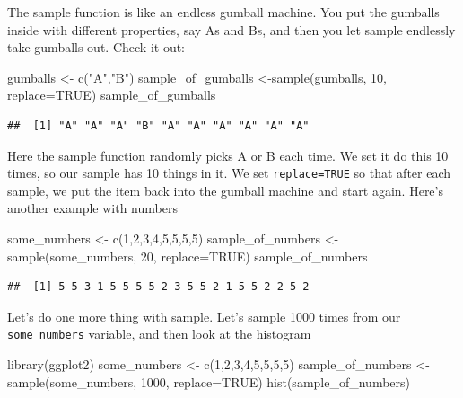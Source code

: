 \documentclass[
]{book}
\newenvironment{Shaded}{\begin{snugshade}}{\end{snugshade}}
\newcommand{\AttributeTok}[1]{\textcolor[rgb]{0.77,0.63,0.00}{#1}}
\newcommand{\ConstantTok}[1]{\textcolor[rgb]{0.00,0.00,0.00}{#1}}
\newcommand{\DecValTok}[1]{\textcolor[rgb]{0.00,0.00,0.81}{#1}}
\newcommand{\FunctionTok}[1]{\textcolor[rgb]{0.00,0.00,0.00}{#1}}
\newcommand{\NormalTok}[1]{#1}
\newcommand{\OtherTok}[1]{\textcolor[rgb]{0.56,0.35,0.01}{#1}}
\newcommand{\StringTok}[1]{\textcolor[rgb]{0.31,0.60,0.02}{#1}}
\begin{document}
The sample function is like an endless gumball machine. You put the gumballs inside with different properties, say As and Bs, and then you let sample endlessly take gumballs out. Check it out:

\begin{Shaded}
\begin{Highlighting}[]
\NormalTok{gumballs }\OtherTok{\textless{}{-}} \FunctionTok{c}\NormalTok{(}\StringTok{"A"}\NormalTok{,}\StringTok{"B"}\NormalTok{)}
\NormalTok{sample\_of\_gumballs }\OtherTok{\textless{}{-}}\FunctionTok{sample}\NormalTok{(gumballs, }\DecValTok{10}\NormalTok{, }\AttributeTok{replace=}\ConstantTok{TRUE}\NormalTok{)}
\NormalTok{sample\_of\_gumballs}
\end{Highlighting}
\end{Shaded}

\begin{verbatim}
##  [1] "A" "A" "A" "B" "A" "A" "A" "A" "A" "A"
\end{verbatim}

Here the sample function randomly picks A or B each time. We set it do this 10 times, so our sample has 10 things in it. We set \texttt{replace=TRUE} so that after each sample, we put the item back into the gumball machine and start again. Here's another example with numbers

\begin{Shaded}
\begin{Highlighting}[]
\NormalTok{some\_numbers }\OtherTok{\textless{}{-}} \FunctionTok{c}\NormalTok{(}\DecValTok{1}\NormalTok{,}\DecValTok{2}\NormalTok{,}\DecValTok{3}\NormalTok{,}\DecValTok{4}\NormalTok{,}\DecValTok{5}\NormalTok{,}\DecValTok{5}\NormalTok{,}\DecValTok{5}\NormalTok{,}\DecValTok{5}\NormalTok{)}
\NormalTok{sample\_of\_numbers }\OtherTok{\textless{}{-}}\FunctionTok{sample}\NormalTok{(some\_numbers, }\DecValTok{20}\NormalTok{, }\AttributeTok{replace=}\ConstantTok{TRUE}\NormalTok{)}
\NormalTok{sample\_of\_numbers}
\end{Highlighting}
\end{Shaded}

\begin{verbatim}
##  [1] 5 5 3 1 5 5 5 5 2 3 5 5 2 1 5 5 2 2 5 2
\end{verbatim}

Let's do one more thing with sample. Let's sample 1000 times from our \texttt{some\_numbers} variable, and then look at the histogram

\begin{Shaded}
\begin{Highlighting}[]
\FunctionTok{library}\NormalTok{(ggplot2)}
\NormalTok{some\_numbers }\OtherTok{\textless{}{-}} \FunctionTok{c}\NormalTok{(}\DecValTok{1}\NormalTok{,}\DecValTok{2}\NormalTok{,}\DecValTok{3}\NormalTok{,}\DecValTok{4}\NormalTok{,}\DecValTok{5}\NormalTok{,}\DecValTok{5}\NormalTok{,}\DecValTok{5}\NormalTok{,}\DecValTok{5}\NormalTok{)}
\NormalTok{sample\_of\_numbers }\OtherTok{\textless{}{-}}\FunctionTok{sample}\NormalTok{(some\_numbers, }\DecValTok{1000}\NormalTok{, }\AttributeTok{replace=}\ConstantTok{TRUE}\NormalTok{)}
\FunctionTok{hist}\NormalTok{(sample\_of\_numbers)}
\end{Highlighting}
\end{Shaded}
\end{document}
